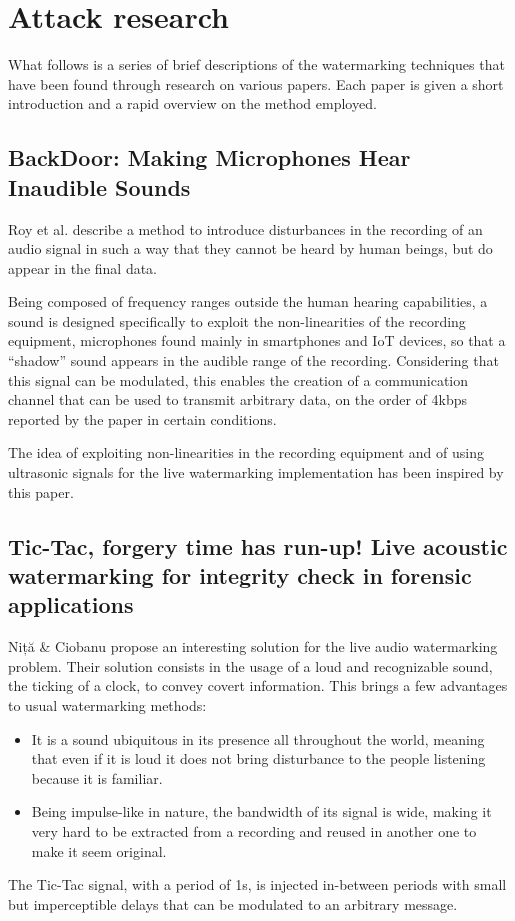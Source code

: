 \setlength{\parindent}{0pt}
\setlength{\parskip}{2pt}

\chapter{Attack research} 


What follows is a series of brief descriptions of the watermarking techniques that have been found through research on various papers. Each paper is given a short introduction and a rapid overview on the method employed.



\section{BackDoor: Making Microphones Hear Inaudible Sounds}

Roy et al. \cite{backdoor} describe a method to introduce disturbances in the recording of an audio signal in such a way that they cannot be heard by human beings, but do appear in the final data. 


Being composed of frequency ranges outside the human hearing capabilities, a sound is designed specifically to exploit the non-linearities of the recording equipment, microphones found mainly in smartphones and IoT devices, so that a “shadow” sound appears in the audible range of the recording. 
Considering that this signal can be modulated, this enables the creation of a communication channel that can be used to transmit arbitrary data, on the order of 4kbps reported by the paper in certain conditions.



The idea of exploiting non-linearities in the recording equipment and of using ultrasonic signals for the live watermarking implementation has been inspired by this paper.


\section{Tic-Tac, forgery time has run-up! Live acoustic watermarking for integrity check in forensic applications}
Niță \& Ciobanu \cite{tictac} propose an interesting solution for the live audio watermarking problem. Their solution consists in the usage of a loud and recognizable sound, the ticking of a clock, to convey covert information. This brings a few advantages to usual watermarking methods:
\begin{itemize}
	\item It is a sound ubiquitous in its presence all throughout the world, meaning that even if it is loud it does not bring disturbance to the people listening because it is familiar.
	\item Being impulse-like in nature, the bandwidth of its signal is wide, making it very hard to be extracted from a recording and reused in another one to make it seem original.
\end{itemize}
The Tic-Tac signal, with a period of 1s, is injected in-between periods with small but imperceptible delays that can be modulated to an arbitrary message.

